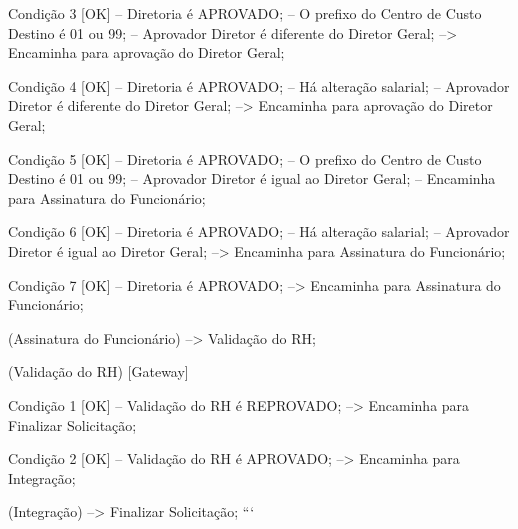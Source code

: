                             Condição 3 [OK]
                              -- Diretoria é APROVADO;
                              -- O prefixo do Centro de Custo Destino é 01 ou 99;
                              -- Aprovador Diretor é diferente do Diretor Geral;
                                 --> Encaminha para aprovação do Diretor Geral;

                            Condição 4 [OK]
                              -- Diretoria é APROVADO;
                              -- Há alteração salarial;
                              -- Aprovador Diretor é diferente do Diretor Geral;
                                 --> Encaminha para aprovação do Diretor Geral;

                            Condição 5 [OK]
                              -- Diretoria é APROVADO;
                              -- O prefixo do Centro de Custo Destino é 01 ou 99;
                              -- Aprovador Diretor é igual ao Diretor Geral;
                                 -- Encaminha para Assinatura do Funcionário;

                            Condição 6 [OK]
                              -- Diretoria é APROVADO;
                              -- Há alteração salarial;
                              -- Aprovador Diretor é igual ao Diretor Geral;
                                 --> Encaminha para Assinatura do Funcionário;

                            Condição 7 [OK]
                              -- Diretoria é APROVADO;
                                 --> Encaminha para Assinatura do Funcionário;

                            (Assinatura do Funcionário)
                               --> Validação do RH;

                               (Validação do RH)
                                  [Gateway]

                                     Condição 1 [OK]
                                       -- Validação do RH é REPROVADO;
                                          --> Encaminha para Finalizar Solicitação;

                                     Condição 2 [OK]
                                       -- Validação do RH é APROVADO;
                                          --> Encaminha para Integração;

                                     (Integração)
                                        --> Finalizar Solicitação;
```
